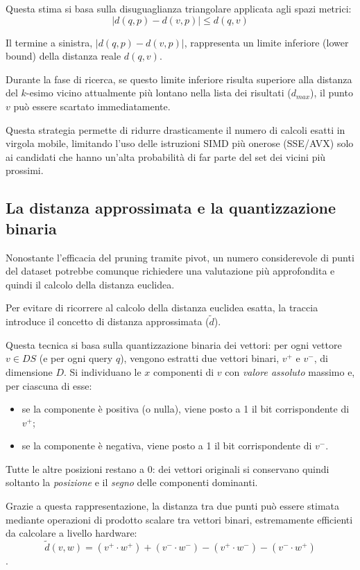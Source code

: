 Questa stima si basa sulla disuguaglianza triangolare applicata agli spazi metrici: \begin{equation} |d(q, p) - d(v, p)| \le d(q, v) \end{equation}

Il termine a sinistra, $|d(q, p) - d(v, p)|$, rappresenta un limite inferiore (lower bound) della distanza reale $d(q, v)$.

Durante la fase di ricerca, se questo limite inferiore risulta superiore alla distanza del $k$-esimo vicino attualmente più lontano nella lista dei risultati ($d_{max}$), il punto $v$ può essere scartato immediatamente.

Questa strategia permette di ridurre drasticamente il numero di calcoli esatti in virgola mobile, limitando l'uso delle istruzioni SIMD più onerose (SSE/AVX) solo ai candidati che hanno un'alta probabilità di far parte del set dei vicini più prossimi.

\subsection{La distanza approssimata e la quantizzazione binaria}
Nonostante l'efficacia del pruning tramite pivot, un numero considerevole di punti del dataset potrebbe comunque richiedere una valutazione più approfondita e quindi il calcolo della distanza euclidea. 

Per evitare di ricorrere al calcolo della distanza euclidea esatta, la traccia introduce il concetto di distanza approssimata ($\tilde{d}$).

Questa tecnica si basa sulla quantizzazione binaria dei vettori: per ogni vettore $v \in DS$ (e per ogni query $q$), vengono estratti due vettori binari, $v^+$ e $v^-$, di dimensione $D$. Si individuano le $x$ componenti di $v$ con \emph{valore assoluto} massimo e, per ciascuna di esse:
\begin{itemize}
	\item se la componente è positiva (o nulla), viene posto a 1 il bit corrispondente di $v^+$;
	\item se la componente è negativa, viene posto a 1 il bit corrispondente di $v^-$.
\end{itemize}
Tutte le altre posizioni restano a 0: dei vettori originali si conservano quindi soltanto la \emph{posizione} e il \emph{segno} delle componenti dominanti.

Grazie a questa rappresentazione, la distanza tra due punti può essere stimata mediante operazioni di prodotto scalare tra vettori binari, estremamente efficienti da calcolare a livello hardware:
\begin{equation}\tilde{d}(v,w) = (v^+ \cdot w^+) + (v^- \cdot w^-) - (v^+ \cdot w^-) - (v^- \cdot w^+)\end{equation}.


